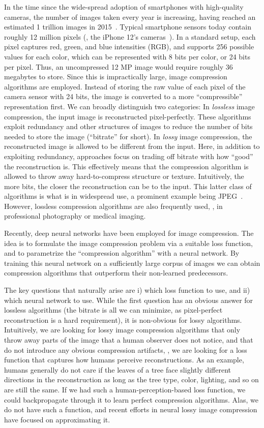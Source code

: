 In the time since the wide-spread adoption of smartphones with high-quality
cameras, the number of images taken every year is increasing, having reached an
estimated 1 trillion images in 2015~\cite{statisticaurl}.  Typical smartphone
sensors today contain roughly 12 million pixels (\eg, the iPhone 12's
cameras~\cite{iphone12url}).  In a standard setup, each pixel captures red,
green, and blue intensities (RGB), and supports 256 possible values for each
color, which can be represented with 8 bits per color, or 24 bits per pixel.
Thus, an uncompressed 12 MP image would require roughly 36 megabytes to store.
Since this is impractically large, image compression algorithms are employed.
Instead of storing the raw value of each pixel of the camera sensor with 24
bits, the image is converted to a more ``compressible'' representation first.
We can broadly distinguish two categories: In \emph{lossless} image
compression, the input image is reconstructed pixel-perfectly.  These
algorithms exploit redundancy and other structures of images to reduce the
number of bits needed to store the image (``bitrate'' for short).
In \emph{lossy} image compression, the reconstructed image is allowed
to be different from the input. Here, in addition to exploiting redundancy,
approaches focus on trading off bitrate with how ``good'' the reconstruction
is. This effectively means that the compression algorithm is allowed to throw
away hard-to-compress structure or texture. Intuitively, the more bits, the closer
the reconstruction can be to the input. This latter class of algorithms is what
is in widespread use, a prominent example being JPEG~\cite{jpeg1992wallace}.
However, lossless compression algorithms are also frequently used, \eg, in
professional photography or medical imaging.

Recently, deep neural networks have been employed for image compression.
The idea is to formulate the image compression problem via a suitable loss function,
and to parametrize the ``compression algorithm'' with a neural network. By training
this neural network
on a sufficiently large corpus of images we can obtain compression algorithms
that outperform their non-learned predecessors. 

The key questions that naturally arise are 
i) which loss function to use, and ii) which neural network to use.
While the first question has an obvious answer for lossless algorithms (the bitrate is all we can minimize, as pixel-perfect reconstruction is a hard requirement),
it is non-obvious for lossy algorithms. Intuitively, we are looking for
lossy image compression algorithms that only throw away parts of the image
that a human observer does not notice, and that do not introduce any obvious 
compression artifacts, \ie, we are looking for 
a loss function that captures how humans perceive reconstructions. As an example,
humans generally do not care if the leaves of a tree face slightly different directions
in the reconstruction as long as the tree type, color, lighting, and so on are still the same. 
If we had such a human-perception-based loss function, we could backpropagate through it to learn perfect
compression algorithms. Alas, we do not have such a function, and recent
efforts in neural lossy image compression have focused on approximating it.

